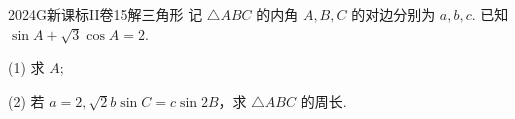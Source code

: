 
\begin{problem}{2024}{G}{新课标II卷}{15}{解三角形}
记 $\triangle ABC$ 的内角 $A,B,C$ 的对边分别为 $a,b,c$. 已知 $\sin A+\sqrt{3}\cos A=2$.

(1) 求 $A$;

(2) 若 $a=2, \sqrt{2}b\sin C=c\sin 2B$，求 $\triangle ABC$ 的周长.
\end{problem}